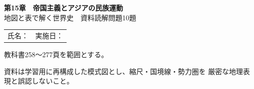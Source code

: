 \documentclass[a4paper,11pt]{ltjsarticle}
\begin{document}
\begin{center}
  {\LARGE\bfseries\color{navy}
  第15章　帝国主義とアジアの民族運動}\\[2mm]

  {\Large 地図と表で解く世界史　資料読解問題10題}
\end{center}

\vspace{3mm}

\begin{tabularx}{\textwidth}{X X}
氏名：\hrulefill & 実施日：\hrulefill
\end{tabularx}

\begin{tcolorbox}[
  colback=pale,
  colframe=teal,
  boxrule=0.5pt
]
教科書258〜277頁を範囲とする。

資料は学習用に再構成した模式図とし、縮尺・国境線・勢力圏を
厳密な地理表現と誤認しないこと。
\end{tcolorbox}

\end{document}
